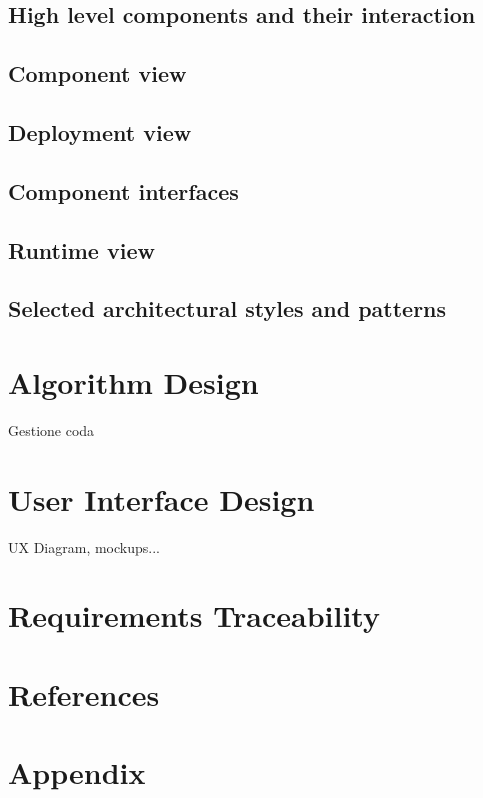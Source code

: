 \documentclass[12pt, a4paper]{article}
\begin{document}
    	\subsection{High level components and their interaction}
    	    
 
        \subsection{Component view}
            
    	
    	\subsection{Deployment view}
    	    
    	
    	\subsection{Component interfaces}
    	    
    	
    	\subsection{Runtime view}
    	
    	
    	
    	\subsection{Selected architectural styles and patterns}
    	
    	
    \newpage	    
    \section{Algorithm Design}
        Gestione coda
    
    \newpage
    \section{User Interface Design}
        UX Diagram, mockups...
        
    \newpage
    \section{Requirements Traceability}
        
    \newpage
    \section{References}
        
        
    \newpage
    \section*{Appendix}
        
\end{document}

